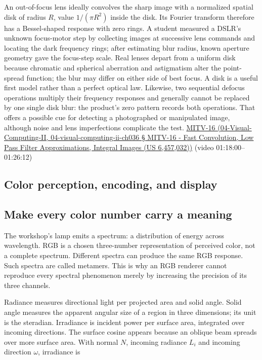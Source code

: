 An out-of-focus lens ideally convolves the sharp image with a normalized spatial disk of radius \(R\), value \(1/(\pi R^2)\) inside the disk. Its Fourier transform therefore has a Bessel-shaped response with zero rings. A student measured a DSLR's unknown focus-motor step by collecting images at successive lens commands and locating the dark frequency rings; after estimating blur radius, known aperture geometry gave the focus-step scale. Real lenses depart from a uniform disk because chromatic and spherical aberration and astigmatism alter the point-spread function; the blur may differ on either side of best focus. A disk is a useful first model rather than a perfect optical law. Likewise, two sequential defocus operations multiply their frequency responses and generally cannot be replaced by one single disk blur: the product's zero pattern records both operations. That offers a possible cue for detecting a photographed or manipulated image, although noise and lens imperfections complicate the test. \href{}{MITV-16 (04-Visual-Computing-II, 04-visual-computing-ii-ch036 § MITV-16 - Fast Convolution, Low Pass Filter Approximations, Integral Images (US 6,457,032))} (video 01:18:00--01:26:12)

\subsection{Color perception, encoding, and display}\label{color-perception-encoding-and-display}

\subsection{Make every color number carry a meaning}\label{make-every-color-number-carry-a-meaning}

The workshop's lamp emits a spectrum: a distribution of energy across wavelength. RGB is a chosen three-number representation of perceived color, not a complete spectrum. Different spectra can produce the same RGB response. Such spectra are called metamers. This is why an RGB renderer cannot reproduce every spectral phenomenon merely by increasing the precision of its three channels.

Radiance measures directional light per projected area and solid angle. Solid angle measures the apparent angular size of a region in three dimensions; its unit is the steradian. Irradiance is incident power per surface area, integrated over incoming directions. The surface cosine appears because an oblique beam spreads over more surface area. With normal \(N\), incoming radiance \(L_i\) and incoming direction \(\omega\), irradiance is


